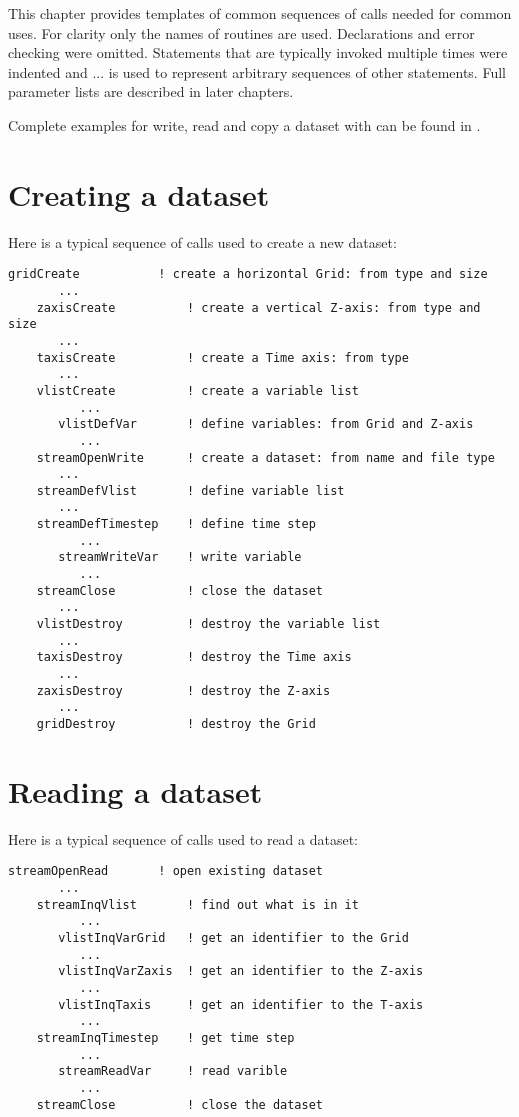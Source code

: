 This chapter provides templates of common sequences of {\CDI} calls needed for common uses.
For clarity only the names of routines are used. Declarations and error checking were omitted.
Statements that are typically invoked multiple times were indented and ... is used to 
represent arbitrary sequences of other statements. 
Full parameter lists are described in later chapters.

Complete examples for write, read and copy a dataset with {\CDI}
can be found in .

\section{Creating a dataset}

Here is a typical sequence of {\CDI} calls used to create a new dataset:

\begin{lstlisting}[backgroundcolor=\color{pyellow}, basicstyle=\small]
    gridCreate           ! create a horizontal Grid: from type and size
       ...
    zaxisCreate          ! create a vertical Z-axis: from type and size
       ...
    taxisCreate          ! create a Time axis: from type
       ...
    vlistCreate          ! create a variable list
          ...
       vlistDefVar       ! define variables: from Grid and Z-axis
          ...
    streamOpenWrite      ! create a dataset: from name and file type
       ...
    streamDefVlist       ! define variable list
       ...
    streamDefTimestep    ! define time step
          ...   
       streamWriteVar    ! write variable
          ...
    streamClose          ! close the dataset
       ...
    vlistDestroy         ! destroy the variable list
       ...
    taxisDestroy         ! destroy the Time axis
       ...
    zaxisDestroy         ! destroy the Z-axis
       ...
    gridDestroy          ! destroy the Grid
\end{lstlisting}


\section{Reading a dataset}

Here is a typical sequence of {\CDI} calls used to read a dataset:

\begin{lstlisting}[backgroundcolor=\color{pyellow}, basicstyle=\small]
    streamOpenRead       ! open existing dataset
       ...
    streamInqVlist       ! find out what is in it
          ...
       vlistInqVarGrid   ! get an identifier to the Grid
          ...
       vlistInqVarZaxis  ! get an identifier to the Z-axis
          ...
       vlistInqTaxis     ! get an identifier to the T-axis
          ...
    streamInqTimestep    ! get time step
          ...
       streamReadVar     ! read varible
          ...
    streamClose          ! close the dataset
\end{lstlisting}


